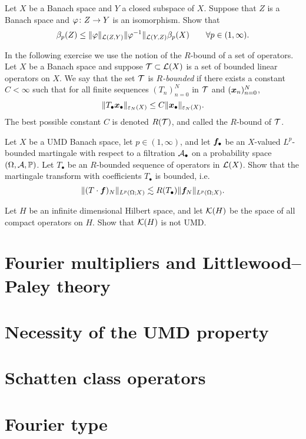 \documentclass[a4paper,10pt]{amsbook}
\begin{document}
\begin{exercise}\label{ex:UMD-isomorphism}
  Let $X$ be a Banach space and $Y$ a closed subspace of $X$.
  Suppose that $Z$ is a Banach space and $\varphi \colon Z \rightarrow Y$ is an isomorphism.
  Show that 
  \begin{equation*}
    \beta_{p}(Z) \leq \|\varphi\|_{\mathcal{L}(Z,Y)} \|\varphi^{-1}\|_{\mathcal{L}(Y,Z)} \beta_{p}(X) \qquad \forall p \in (1,\infty).
  \end{equation*}
\end{exercise}

In the following exercise we use the notion of the $R$-bound of a set of operators.
Let $X$ be a Banach space and suppose $\mathcal{T} \subset \mathcal{L}(X)$ is a set of bounded linear operators on $X$.
We say that the set $\mathcal{T}$ is \emph{$R$-bounded} if there exists a constant $C < \infty$ such that for all finite sequences $(T_{n})_{n=0}^{N}$ in $\mathcal{T}$ and $(\bm{x}_{n})_{n=0}^{N}$,
\begin{equation*}
  \|T_{\bullet} \bm{x}_{\bullet}\|_{\varepsilon_{N}(X)} \leq C \|\bm{x}_{\bullet}\|_{\varepsilon_{N}(X)}.
\end{equation*}
The best possible constant $C$ is denoted $R(\mathcal{T})$, and called the $R$-bound of $\mathcal{T}$.

\begin{exercise}
  Let $X$ be a UMD Banach space, let $p \in (1,\infty)$, and let $\bm{f}_{\bullet}$ be an $X$-valued $L^p$-bounded martingale with respect to a filtration $\mathcal{A}_{\bullet}$ on a probability space $(\Omega,\mathcal{A},\mathbb{P})$.
  Let $T_{\bullet}$ be an $R$-bounded sequence of operators in $\mathcal{L}(X)$.
  Show that the martingale transform with coefficients $T_{\bullet}$ is bounded, i.e.
  \begin{equation*}
    \| (T \cdot \bm{f})_{N} \|_{L^p(\Omega;X)} \lesssim R(T_{\bullet}) \|\bm{f}_{N}\|_{L^p(\Omega;X)}.
  \end{equation*}
\end{exercise}

\begin{exercise}
  Let $H$ be an infinite dimensional Hilbert space, and let $\mathcal{K}(H)$ be the space of all compact operators on $H$.
  Show that $\mathcal{K}(H)$ is not UMD.
\end{exercise}

\section{Fourier multipliers and Littlewood--Paley theory}

\section{Necessity of the UMD property}

\section{Schatten class operators}

\section{Fourier type}
\end{document}
